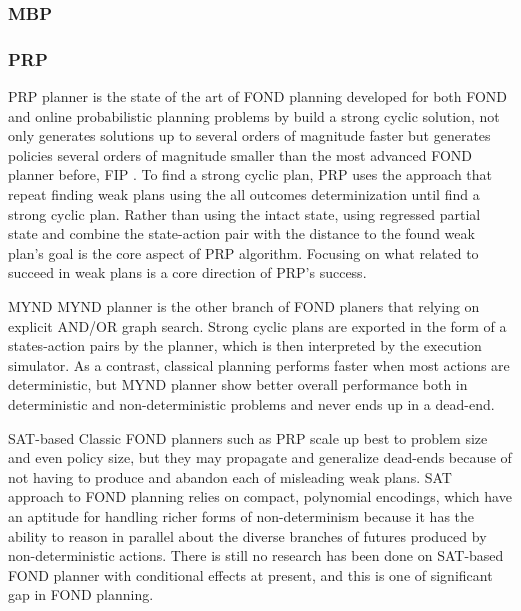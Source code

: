 \documentclass[a4paper,12pt]{article}
\begin{document}
\subsubsection{MBP}

\subsubsection{PRP}
PRP planner is the state of the art of FOND planning developed for both FOND and online probabilistic planning problems by build a strong cyclic solution, not only generates solutions up to several orders of magnitude faster but generates policies several orders of magnitude smaller than the most advanced FOND planner before, FIP \cite{key7}. To find a strong cyclic plan, PRP uses the approach that repeat finding weak plans using the all outcomes determinization until find a strong cyclic plan. Rather than using the intact state, using regressed partial state and combine the state-action pair with the distance to the found weak plan’s goal is the core aspect of PRP algorithm. Focusing on what related to succeed in weak plans is a core direction of PRP's success\cite{key9}.




\begin{subsubsection}{{\footnotesize MY}ND}
{\scriptsize MY}ND planner is the other branch of FOND planers that relying on explicit AND/OR graph search. Strong cyclic plans are  exported in the form of a states-action pairs by the planner, which is then interpreted by the execution simulator\cite{key10}.  As a contrast, classical planning performs faster when most actions are deterministic, but {\scriptsize MY}ND planner show better overall performance both in deterministic and non-deterministic problems and never ends up in a dead-end\cite{key10}.
\end{subsubsection}

\begin{subsubsection}{SAT-based}
Classic FOND planners such as PRP scale up best to problem size and even policy size, but they may propagate and generalize dead-ends because of not having to produce and abandon each of misleading weak plans\cite{key8}. SAT approach to FOND planning relies on compact, polynomial encodings, which have an aptitude for handling richer forms of non-determinism because it has the ability to reason in parallel about the diverse branches of futures produced by non-deterministic actions\cite{key8}. There is still no research has been done on SAT-based FOND planner with conditional effects at present, and this is one of significant gap in FOND planning. 

\end{subsubsection}
\end{document}
